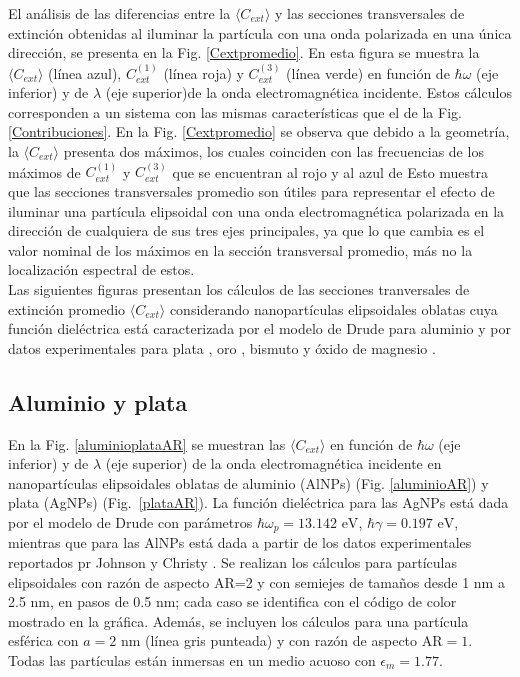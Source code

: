 El análisis de las diferencias entre la $\langle C_{ext}\rangle$ y  las secciones transversales de extinción obtenidas al iluminar la partícula con una onda polarizada en una única dirección, se presenta en la Fig. \ref{Cextpromedio}. En esta figura se muestra la $\langle C_{ext}\rangle$ (línea azul), $C_{ext}^{(1)}$ (línea roja) y $C_{ext}^{(3)}$ (línea verde) en función de $\hbar\omega$ (eje inferior) y de $\lambda$ (eje superior)de la onda electromagnética incidente. Estos cálculos corresponden a un sistema con las mismas características que el de la Fig. \ref{Contribuciones}. En la Fig. \ref{Cextpromedio} se observa que debido a la geometría, la 
$\langle C_{ext}\rangle$ presenta dos máximos, los cuales coinciden con las frecuencias de los máximos de $C_{ext}^{(1)}$ y $C_{ext}^{(3)}$ que se encuentran al rojo y al azul de
Esto muestra que las secciones transversales promedio son útiles para representar el efecto de iluminar una partícula elipsoidal con una onda electromagnética polarizada en la dirección de cualquiera de sus tres ejes principales, ya que lo que cambia es el valor nominal de los máximos en la sección transversal promedio, más no la localización espectral de estos. \\

Las siguientes figuras presentan los cálculos de las secciones tranversales de extinción promedio  $\langle C_{ext}\rangle$ considerando nanopartículas elipsoidales oblatas cuya función dieléctrica está caracterizada por el modelo de Drude para aluminio \cite{Aluminio} y por datos experimentales para plata \cite{Plata}, oro \cite{Plata}, bismuto \cite{Bismuto} y  óxido de magnesio \cite{MgO}.


\subsection*{Aluminio y plata}
En la Fig. \ref{aluminioplataAR} se muestran las $\langle C_{ext}\rangle$ en función de $\hbar\omega$ (eje inferior) y de  $\lambda$ (eje superior) de la onda electromagnética incidente en nanopartículas elipsoidales oblatas de aluminio (AlNPs) (Fig. \ref{aluminioAR}) y plata (AgNPs) (Fig.~\ref{plataAR}). La función dieléctrica para las AgNPs está dada por el modelo de Drude con parámetros $\hbar\omega_p=13.142\text{ eV}$, $\hbar\gamma=0.197\text{ eV}$, mientras que para las AlNPs  está dada a partir de los datos experimentales reportados pr Johnson y Christy \cite{Plata}. Se realizan los cálculos para partículas elipsoidales con razón de aspecto AR=2 y con semiejes de tamaños desde 1 nm a 2.5 nm, en pasos de 0.5 nm; cada caso se identifica con el código de color mostrado en la gráfica. Además, se incluyen los cálculos para una partícula esférica con $a=2 \text{ nm}$ (línea gris punteada) y con razón de aspecto AR$=1$. Todas las partículas están  inmersas en un medio acuoso con $\epsilon_m=1.77$.\\

